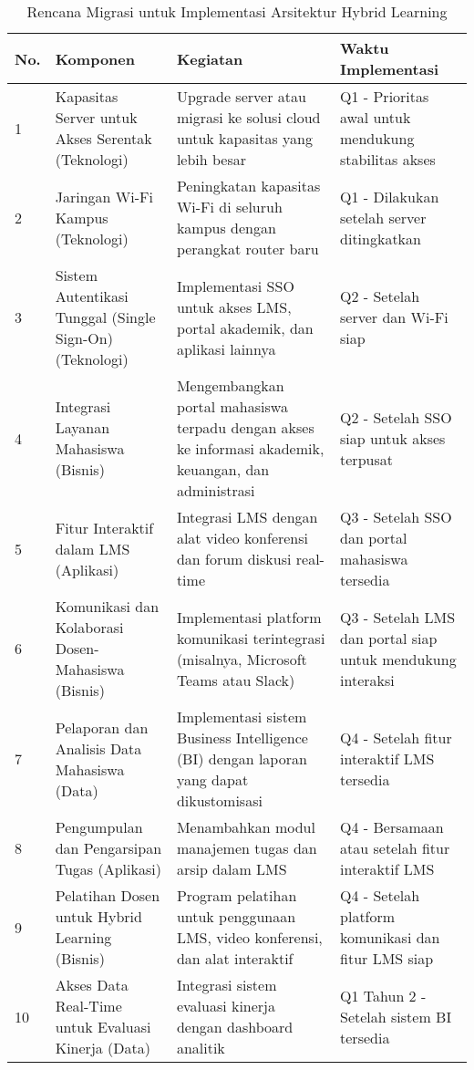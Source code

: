 \begin{table}[ht!]
	\centering
	\begin{tabular}{|p{}|p{}|p{}|p{}|}
		\hline
		\textbf{No.} & \textbf{Komponen} & \textbf{Kegiatan} & \textbf{Waktu Implementasi} \\
		\hline
		1 & Kapasitas Server untuk Akses Serentak (Teknologi) & 
		Upgrade server atau migrasi ke solusi cloud untuk kapasitas yang lebih besar & 
		Q1 - Prioritas awal untuk mendukung stabilitas akses \\
		\hline
		2 & Jaringan Wi-Fi Kampus (Teknologi) & 
		Peningkatan kapasitas Wi-Fi di seluruh kampus dengan perangkat router baru & 
		Q1 - Dilakukan setelah server ditingkatkan \\
		\hline
		3 & Sistem Autentikasi Tunggal (Single Sign-On) (Teknologi) & 
		Implementasi SSO untuk akses LMS, portal akademik, dan aplikasi lainnya & 
		Q2 - Setelah server dan Wi-Fi siap \\
		\hline
		4 & Integrasi Layanan Mahasiswa (Bisnis) & 
		Mengembangkan portal mahasiswa terpadu dengan akses ke informasi akademik, keuangan, dan administrasi & 
		Q2 - Setelah SSO siap untuk akses terpusat \\
		\hline
		5 & Fitur Interaktif dalam LMS (Aplikasi) & 
		Integrasi LMS dengan alat video konferensi dan forum diskusi real-time & 
		Q3 - Setelah SSO dan portal mahasiswa tersedia \\
		\hline
		6 & Komunikasi dan Kolaborasi Dosen-Mahasiswa (Bisnis) & 
		Implementasi platform komunikasi terintegrasi (misalnya, Microsoft Teams atau Slack) & 
		Q3 - Setelah LMS dan portal siap untuk mendukung interaksi \\
		\hline
		7 & Pelaporan dan Analisis Data Mahasiswa (Data) & 
		Implementasi sistem Business Intelligence (BI) dengan laporan yang dapat dikustomisasi & 
		Q4 - Setelah fitur interaktif LMS tersedia \\
		\hline
		8 & Pengumpulan dan Pengarsipan Tugas (Aplikasi) & 
		Menambahkan modul manajemen tugas dan arsip dalam LMS & 
		Q4 - Bersamaan atau setelah fitur interaktif LMS \\
		\hline
		9 & Pelatihan Dosen untuk Hybrid Learning (Bisnis) & 
		Program pelatihan untuk penggunaan LMS, video konferensi, dan alat interaktif & 
		Q4 - Setelah platform komunikasi dan fitur LMS siap \\
		\hline
		10 & Akses Data Real-Time untuk Evaluasi Kinerja (Data) & 
		Integrasi sistem evaluasi kinerja dengan dashboard analitik & 
		Q1 Tahun 2 - Setelah sistem BI tersedia \\
		\hline
	\end{tabular}
	\caption{Rencana Migrasi untuk Implementasi Arsitektur Hybrid Learning}
	\label{tab:rencana_migrasi_arsitektur_hybrid_learning}
\end{table}


